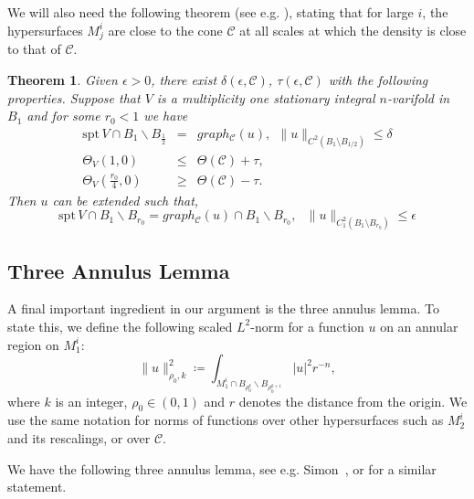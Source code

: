 \documentclass[12pt, reqno ]{amsart}
\newtheorem{theorem}{Theorem}[section]
\numberwithin{equation}{section}
\begin{document}
We will also need the following theorem (see e.g. \cite[Theorem 13.1]{Edelen2024}), stating that for large $i$, the hypersurfaces $M^i_j$ are close to the cone $\mathcal{C}$ at all scales at which the density is close to that of $\mathcal{C}$. 

\begin{theorem}\label{prel:thm:Density}
      Given $\epsilon>0$, there exist $\delta (\epsilon, \mathcal C)$, $\tau (\epsilon, \mathcal C)$ with the following properties. Suppose that $V$ is a multiplicity one stationary integral $n$-varifold in $B_1$ and for some $r_0 < 1$ we have
 \begin{eqnarray*}
        \mbox{spt}\, V\cap B_1\backslash B_\frac{1}{2}&=& graph_\mathcal C (u),\:\: \|u\|_{C^2(B_1\setminus B_{1/2})}\leq \delta\\
        \Theta_V(1,0)&\leq& \Theta(\mathcal C)+\tau,\\ 
        \Theta_V\left(\frac{r_0}{4},0\right)&\geq& \Theta(\mathcal C)-\tau.
    \end{eqnarray*}
  Then $u $ can be extended such that, 
\begin{equation}
\mbox{spt}\,V\cap B_1\backslash B_{r_0}=graph_\mathcal C (u)\cap B_1\backslash B_{r_0}, \:\:\: \|u\|_{C^2_1(B_1\setminus B_{r_0})}\leq \epsilon
\end{equation}
\end{theorem}

\subsection{Three Annulus Lemma}
A final important ingredient in our argument is the three annulus lemma. To state this, we define the following scaled $L^2$-norm for a function $u$ on an annular region on $M_1^i$:
$$ \|u\|^2_{\rho_0, k}\coloneqq \int_{M_1^i\cap B_{\rho_0^k}\backslash B_{\rho_0^{k+1}}}|u|^2 r^{-n},$$
where $k$ is an integer, $\rho_0\in (0,1)$ and $r$ denotes the distance from the origin. We use the same notation for norms of functions over other hypersurfaces such as $M_2^i$ and its rescalings, or over $\mathcal{C}$. 

We have the following three annulus lemma, see e.g. Simon~\cite{simon1983isolated}, or \cite{székelyhidi2021minimalhypersurfacescylindricaltangent} for a similar statement. 
\end{document}

